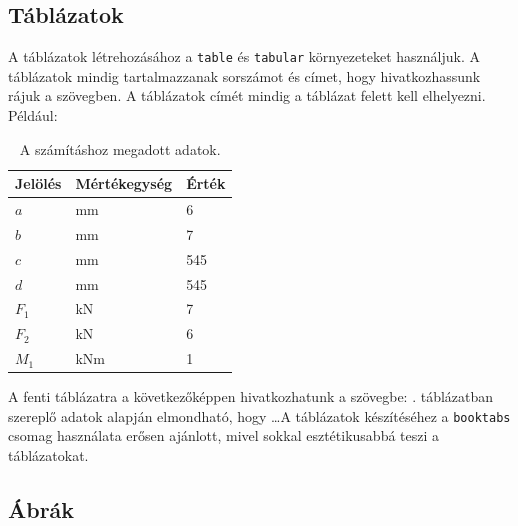 \documentclass[fleqn,12pt]{article}
\begin{document}
    \subsection{Táblázatok}

        A táblázatok létrehozásához a \texttt{table} és \texttt{tabular} környezeteket használjuk. A táblázatok mindig tartalmazzanak sorszámot és címet, hogy hivatkozhassunk rájuk a szövegben. A táblázatok címét mindig a táblázat felett kell elhelyezni. Például:
        \begin{table}[htb!]
            \centering
            \begin{tabular}{C{2cm}C{3cm}C{3cm}}
                \toprule
                \textbf{Jelölés} & \textbf{Mértékegység} & \textbf{Érték} \\
                \midrule
                $a$ & \unit{mm} & 6 \\
                $b$ & \unit{mm} & 7 \\
                $c$ & \unit{mm} & 545 \\
                $d$ & \unit{mm} & 545 \\
                \midrule
                $F_1$ & \unit{kN} & 7 \\
                $F_2$ & \unit{kN} & 6 \\
                $M_1$ & \unit{kNm} & 1 \\
                \bottomrule
            \end{tabular}
            \caption{A számításhoz megadott adatok.}
            \label{table:adatok}
        \end{table}

        A fenti táblázatra a következőképpen hivatkozhatunk a szövegbe: . táblázatban szereplő adatok alapján elmondható, hogy \dots A táblázatok készítéséhez a \texttt{booktabs} csomag használata erősen ajánlott, mivel sokkal esztétikusabbá teszi a táblázatokat.
    
    \newpage
    \subsection{Ábrák}
\end{document}
